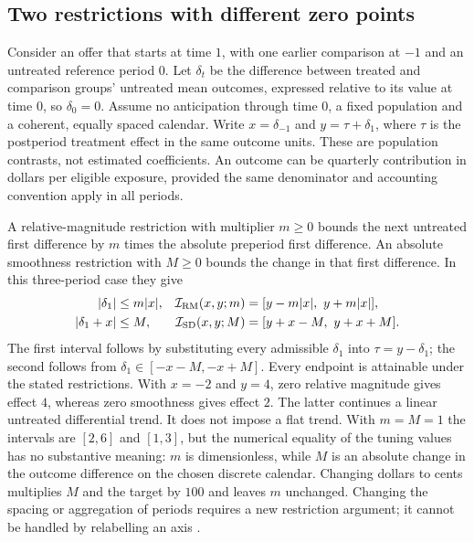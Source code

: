 \subsection{Two restrictions with different zero points}
\label{exec22:hd-restrictions}

Consider an offer that starts at time $1$, with one earlier comparison at $-1$
and an untreated reference period $0$. Let $\delta_t$ be the difference between
treated and comparison groups' untreated mean outcomes, expressed relative to
its value at time $0$, so $\delta_0=0$. Assume no anticipation through time $0$,
a fixed population and a coherent, equally spaced calendar. Write $x=\delta_{-1}$
and $y=\tau+\delta_1$, where $\tau$ is the postperiod treatment effect in the same
outcome units. These are population contrasts, not estimated coefficients.
An outcome can be quarterly contribution in dollars per eligible exposure,
provided the same denominator and accounting convention apply in all periods.

A relative-magnitude restriction with multiplier $m\geq0$ bounds the next
untreated first difference by $m$ times the absolute preperiod first difference.
An absolute smoothness restriction with $M\geq0$ bounds the change in that
first difference. In this three-period case they give
\begin{align}
 |\delta_1|&\leq m|x|,
 &\mathcal I_{\rm RM}(x,y;m)&=[y-m|x|,\ y+m|x|],
 \label{exec22:hd-rm}\\
 |\delta_1+x|&\leq M,
 &\mathcal I_{\rm SD}(x,y;M)&=[y+x-M,\ y+x+M].
 \label{exec22:hd-sd}
\end{align}
The first interval follows by substituting every admissible $\delta_1$ into
$\tau=y-\delta_1$; the second follows from
$\delta_1\in[-x-M,-x+M]$. Every endpoint is attainable under the stated
restrictions. With $x=-2$ and $y=4$, zero relative magnitude gives effect $4$,
whereas zero smoothness gives effect $2$. The latter continues a linear
untreated differential trend. It does not impose a flat trend. With $m=M=1$
the intervals are $[2,6]$ and $[1,3]$, but the numerical equality of the tuning
values has no substantive meaning: $m$ is dimensionless, while $M$ is an
absolute change in the outcome difference on the chosen discrete calendar.
Changing dollars to cents multiplies $M$ and the target by $100$ and leaves
$m$ unchanged. Changing the spacing or aggregation of periods requires a new
restriction argument; it cannot be handled by relabelling an axis
\citep{rambachan2023,exec22_honestdid_reference}.

